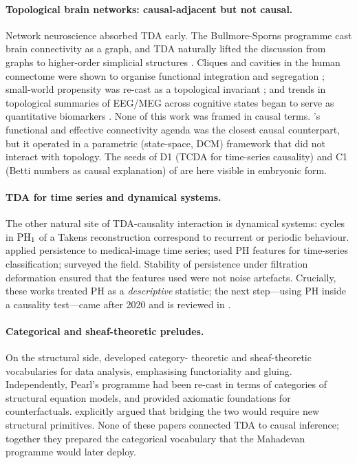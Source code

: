 \paragraph{Topological brain networks: causal-adjacent but not causal.}
Network neuroscience absorbed TDA early. The Bullmore-Sporns programme
\citep{bullmore2009complex,sporns2013structure,bassett2009human} cast
brain connectivity as a graph, and TDA naturally lifted the discussion
from graphs to higher-order simplicial structures
\citep{sizemore2018cliques,sizemore2019importance}. Cliques and cavities
in the human connectome were shown to organise functional integration
and segregation
\citep{sizemore2018cliques}; small-world propensity was
re-cast as a topological invariant \citep{muldoon2016small}; and trends
in topological summaries of EEG/MEG across cognitive states began to
serve as quantitative biomarkers \citep{fathian2022trend,
gorrostieta2018time}. None of this work was framed in causal terms.
\citet{friston2011functional}'s functional and effective connectivity
agenda was the closest causal counterpart, but it operated in a
parametric (state-space, DCM) framework that did not interact with
topology. The seeds of D1 (TCDA for time-series causality) and C1
(Betti numbers as causal explanation) of  are here
visible in embryonic form.

\paragraph{TDA for time series and dynamical systems.}
The other natural site of TDA-causality interaction is dynamical
systems: cycles in $\mathrm{PH}_{1}$ of a Takens reconstruction correspond to
recurrent or periodic behaviour. \citet{chung2009persistence,
pachauri2011topology} applied persistence to medical-image time series;
\citet{umeda2017time,kim2018time} used PH features for time-series
classification; \citet{gholizadeh2018short} surveyed the field. Stability
of persistence under filtration deformation
\citep{cohen2007stability,chazal2016structure} ensured that the
features used were not noise artefacts. Crucially, these works treated
PH as a \emph{descriptive} statistic; the next step---using PH inside a
causality test---came after 2020 and is reviewed in
.

\paragraph{Categorical and sheaf-theoretic preludes.}
On the structural side, \citet{spivak2014category,curry2014sheaves,
robinson2014topological,robinson2014hypothesis} developed category-
theoretic and sheaf-theoretic vocabularies for data analysis,
emphasising functoriality and gluing. Independently, Pearl's
\citep{pearl1995causal,pearl2009causality} programme had been re-cast
in terms of categories of structural equation models, and
\citet{galles1998axiomatic} provided axiomatic foundations for
counterfactuals. \citet{henry2020bridging} explicitly argued that
bridging the two would require new structural primitives. None of
these papers connected TDA to causal inference; together they prepared
the categorical vocabulary that the Mahadevan programme would later
deploy.

